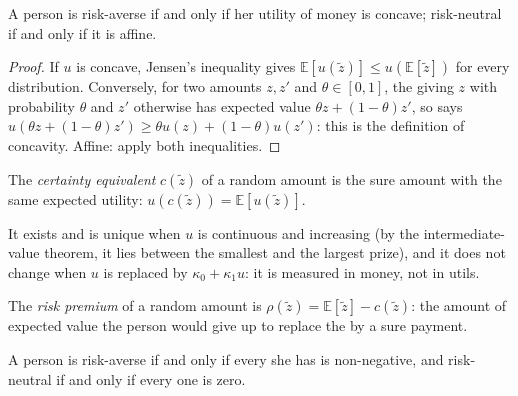 \begin{proposition}\label{prop:b2:expected-utility:concave}
A person is risk-averse if and only if her utility of money is concave; risk-neutral if and only if it
is affine.
\end{proposition}

\begin{proof}
If $u$ is concave, Jensen's inequality gives $\mathbb{E}[u(\tilde z)] \le u(\mathbb{E}[\tilde z])$
for every distribution. Conversely, for two amounts $z, z'$ and $\theta \in [0,1]$, the  giving
$z$ with probability $\theta$ and $z'$ otherwise has expected value $\theta z + (1-\theta) z'$, so  says $u(\theta z + (1-\theta) z') \ge \theta u(z) + (1-\theta) u(z')$: this is the definition
of concavity. Affine: apply both inequalities.
\end{proof}

\begin{definition}\label{def:b2:expected-utility:certainty-equivalent}
The \emph{certainty equivalent} $c(\tilde z)$ of a random amount is the
sure amount with the same expected utility: $u(c(\tilde z)) = \mathbb{E}[u(\tilde z)]$.
\end{definition}

It exists and is unique when $u$ is continuous and increasing (by the intermediate-value theorem, it
lies between the smallest and the largest prize), and it does not change when $u$ is replaced by
$\kappa_0 + \kappa_1 u$: it is measured in money, not in utils.

\begin{definition}\label{def:b2:expected-utility:risk-premium}
The \emph{risk premium} of a random amount is $\rho(\tilde z) = \mathbb{E}[\tilde z]
- c(\tilde z)$: the amount of expected value the person would give up to replace the  by a sure
payment.
\end{definition}

\begin{proposition}\label{prop:b2:expected-utility:premium-sign}
A person is risk-averse if and only if every  she has is non-negative, and risk-neutral if
and only if every one is zero.
\end{proposition}

